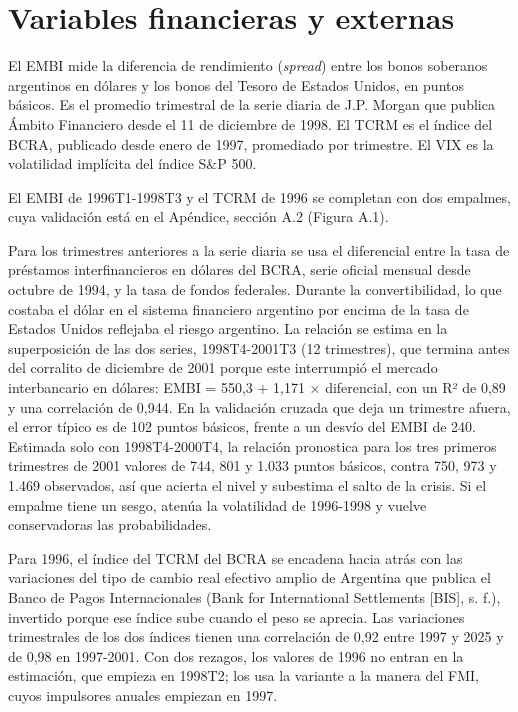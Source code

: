 \section{Variables financieras y externas}

El EMBI mide la diferencia de rendimiento (\emph{spread}) entre los
bonos soberanos argentinos en dólares y los bonos del Tesoro de Estados
Unidos, en puntos básicos. Es el promedio trimestral de la serie diaria
de J.P. Morgan que publica Ámbito Financiero desde el 11 de diciembre de
1998. El TCRM es el índice del BCRA, publicado desde enero de 1997,
promediado por trimestre. El VIX es la volatilidad implícita del índice
S\&P 500.

El EMBI de 1996T1-1998T3 y el TCRM de 1996 se completan con dos
empalmes, cuya validación está en el Apéndice, sección A.2 (Figura A.1).

Para los trimestres anteriores a la serie diaria se usa el diferencial
entre la tasa de préstamos interfinancieros en dólares del BCRA, serie
oficial mensual desde octubre de 1994, y la tasa de fondos federales.
Durante la convertibilidad, lo que costaba el dólar en el sistema
financiero argentino por encima de la tasa de Estados Unidos reflejaba
el riesgo argentino. La relación se estima en la superposición de las
dos series, 1998T4-2001T3 (12 trimestres), que termina antes del
corralito de diciembre de 2001 porque este interrumpió el mercado
interbancario en dólares: EMBI = 550,3 + 1,171 × diferencial, con un R²
de 0,89 y una correlación de 0,944. En la validación cruzada que deja un
trimestre afuera, el error típico es de 102 puntos básicos, frente a un
desvío del EMBI de 240. Estimada solo con 1998T4-2000T4, la relación
pronostica para los tres primeros trimestres de 2001 valores de 744, 801
y 1.033 puntos básicos, contra 750, 973 y 1.469 observados, así que
acierta el nivel y subestima el salto de la crisis. Si el empalme tiene
un sesgo, atenúa la volatilidad de 1996-1998 y vuelve conservadoras las
probabilidades.

Para 1996, el índice del TCRM del BCRA se encadena hacia atrás con las
variaciones del tipo de cambio real efectivo amplio de Argentina que
publica el Banco de Pagos Internacionales (Bank for International
Settlements {[}BIS{]}, s. f.), invertido porque ese índice sube cuando
el peso se aprecia. Las variaciones trimestrales de los dos índices
tienen una correlación de 0,92 entre 1997 y 2025 y de 0,98 en 1997-2001.
Con dos rezagos, los valores de 1996 no entran en la estimación, que
empieza en 1998T2; los usa la variante a la manera del FMI, cuyos
impulsores anuales empiezan en 1997.

